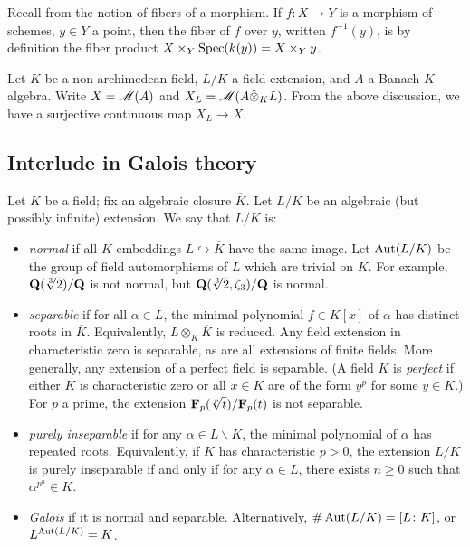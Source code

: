 Recall from \cite[II.3]{hartshorne-1977} the notion of fibers of a morphism. 
If $f\colon X\to Y$ is a morphism of schemes, $y\in Y$ a point, then the fiber 
of $f$ over $y$, written $f^{-1}(y)$, is by definition the fiber product 
$X\times_Y \operatorname{Spec}(k(y)) = X\times_Y y$. 

Let $K$ be a non-archimedean field, $L/K$ a field extension, and $A$ a Banach 
$K$-algebra. Write $X=\operatorname{\mathscr{M}}(A)$ and $X_L=\operatorname{\mathscr{M}}(A\hat\otimes_K L)$. From 
the above discussion, we have a surjective continuous map $X_L\to X$. 




\subsection{Interlude in Galois theory}

Let $K$ be a field; fix an algebraic closure $\overline K$. Let $L/K$ be an 
algebraic (but possibly infinite) extension. We say that $L/K$ is:
\begin{itemize}
\item
\emph{normal} if all $K$-embeddings $L\hookrightarrow \overline K$ have the 
same image. Let $\operatorname{Aut}(L/K)$ be the group of field automorphisms of $L$ which 
are trivial on $K$. For example, $\mathbf{Q}(\sqrt[3]{2})/\mathbf{Q}$ is not normal, but 
$\mathbf{Q}(\sqrt[3]{2},\zeta_3)/\mathbf{Q}$ is normal. 

\item
\emph{separable} if for all $\alpha\in L$, the minimal polynomial 
$f\in K[x]$ of $\alpha$ has distinct roots in $\overline K$. Equivalently, 
$L\otimes_K \overline K$ is reduced. Any field extension in characteristic 
zero is separable, as are all extensions of finite fields. More generally, any 
extension of a perfect field is separable. (A field $K$ is \emph{perfect} if 
either $K$ is characteristic zero or all $x\in K$ are of the form $y^p$ for 
some $y\in K$.) For $p$ a prime, the extension $\mathbf{F}_p(\sqrt[p]{t})/\mathbf{F}_p(t)$ is 
not separable. 

\item
\emph{purely inseparable} if for any $\alpha\in L\smallsetminus K$, the minimal 
polynomial of $\alpha$ has repeated roots. Equivalently, if $K$ has 
characteristic $p>0$, the extension $L/K$ is purely inseparable if and only if 
for any $\alpha\in L$, there exists $n\geqslant 0$ such that 
$\alpha^{p^n}\in K$. 

\item
\emph{Galois} if it is normal and separable. Alternatively, 
$\# \operatorname{Aut}(L/K)=[L\colon K]$, or $L^{\operatorname{Aut}(L/K)} = K$. 
\end{itemize}

